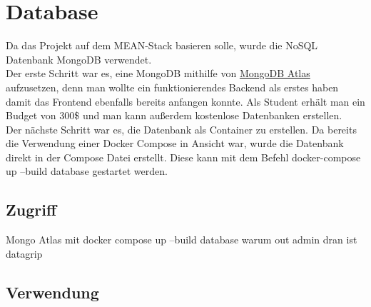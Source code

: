\chapter{Database}\label{ch:db}
Da das Projekt auf dem MEAN-Stack basieren solle, wurde die NoSQL Datenbank MongoDB verwendet.\\
Der erste Schritt war es, eine MongoDB mithilfe von \hyperlink{https://www.mongodb.com/cloud/atlas}{MongoDB Atlas} aufzusetzen, denn man wollte ein funktionierendes Backend als erstes haben damit das Frontend ebenfalls bereits anfangen konnte. Als Student erhält man ein Budget von 300\$ und man kann außerdem kostenlose Datenbanken erstellen.\\
Der nächste Schritt war es, die Datenbank als Container zu erstellen. Da bereits die Verwendung einer Docker Compose in Ansicht war, wurde die Datenbank direkt in der Compose Datei erstellt. Diese kann mit dem Befehl docker-compose up --build database gestartet werden.

\section{Zugriff}
Mongo Atlas
mit docker compose up --build database
warum out admin dran ist
datagrip

\section{Verwendung}